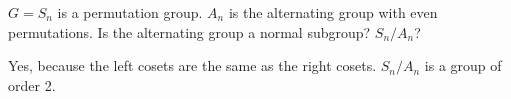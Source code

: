 
\begin{eg}
$G = S_n$ is a permutation group. $A_n$ is the alternating group with even permutations. Is the alternating group a normal subgroup? $S_n / A_n$?
\end{eg}
\begin{answer}
    Yes, because the left cosets are the same as the right cosets. $S_n / A_n$ is a group of order 2.
\end{answer}

